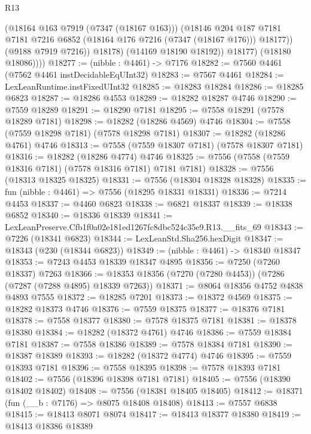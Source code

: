 \begin{lexlean}{R13}
\begin{coremodule}
                    (@18164 @163 @7919 (@7347 (@18167 @163)))
                    (@18146
                      @204
                      @187
                      @7181
                      @7181
                      @7216
                      @6852
                      (@18164 @176 @7216 (@7347 (@18167 @176)))
                      @18177))
                  (@9188 @7919 @7216))
                @18178)
              (@14169 @18190 @18192))
            @18177)
          (@18180 @18086))))
@18277 := (nibble : @4461) -> @7176
@18282 := @7560 @4461 (@7562 @4461 instDecidableEqUInt32)
@18283 := @7567 @4461
@18284 := LexLeanRuntime.instFixedUInt32
@18285 := @18283 @18284
@18286 := @18285 @6823
@18287 := @18286 @4553
@18289 := @18282 @18287 @4746
@18290 := @7559 @18289
@18291 := @18290 @7181
@18295 := @7558 @18291 (@7578 @18289 @7181)
@18298 := @18282 (@18286 @4569) @4746
@18304 := @7558 (@7559 @18298 @7181) (@7578 @18298 @7181)
@18307 := @18282 (@18286 @4761) @4746
@18313 := @7558 (@7559 @18307 @7181) (@7578 @18307 @7181)
@18316 := @18282 (@18286 @4774) @4746
@18325 := @7556 (@7558 (@7559 @18316 @7181) (@7578 @18316 @7181) @7181 @7181)
@18328 := @7556 (@18313 @18325 @18325)
@18331 := @7556 (@18304 @18328 @18328)
@18335 := fun (nibble : @4461) => @7556 (@18295 @18331 @18331)
@18336 := @7214 @4453
@18337 := @4460 @6823
@18338 := @6821 @18337
@18339 := @18338 @6852
@18340 := @18336 @18339
@18341 := LexLeanPreserve.Cfb1f0a02e181ed1267fc8dbc524c35e9.R13.__fits_69
@18343 := @7226 (@18341 @6823)
@18344 := LexLeanStd.Sha256.hexDigit
@18347 := @18343 (@230 (@18344 @6823))
@18349 := (nibble : @4461) -> @18340 @18347
@18353 := @7243 @4453 @18339 @18347 @4895
@18356 := @7250 (@7260 @18337) @7263
@18366 := @18353 @18356 (@7270 (@7280 @4453)) (@7286 (@7287 (@7288 @4895) @18339 @7263))
@18371 := @8064 @18356 @4752 @4838 @4893 @7555
@18372 := @18285 @7201
@18373 := @18372 @4569
@18375 := @18282 @18373 @4746
@18376 := @7559 @18375
@18377 := @18376 @7181
@18378 := @7558 @18377
@18380 := @7578 @18375 @7181
@18381 := @18378 @18380
@18384 := @18282 (@18372 @4761) @4746
@18386 := @7559 @18384 @7181
@18387 := @7558 @18386
@18389 := @7578 @18384 @7181
@18390 := @18387 @18389
@18393 := @18282 (@18372 @4774) @4746
@18395 := @7559 @18393 @7181
@18396 := @7558 @18395
@18398 := @7578 @18393 @7181
@18402 := @7556 (@18396 @18398 @7181 @7181)
@18405 := @7556 (@18390 @18402 @18402)
@18408 := @7556 (@18381 @18405 @18405)
@18412 := @18371 (fun (__b : @7176) => @8075 @18408 @18408)
@18413 := @7557 @6838
@18415 := @18413 @8071 @8074
@18417 := @18413 @18377 @18380
@18419 := @18413 @18386 @18389

\end{coremodule}
\end{lexlean}
